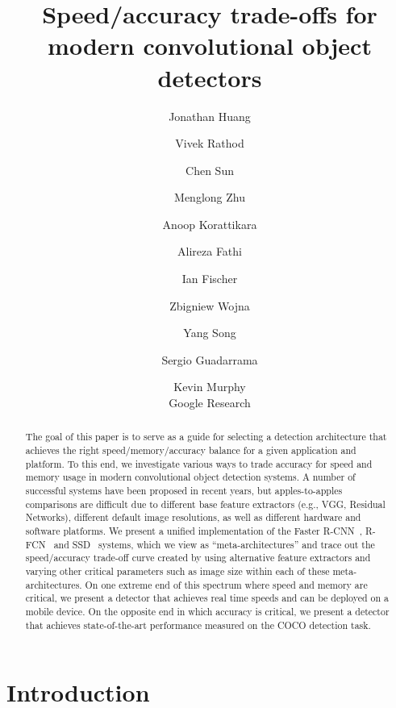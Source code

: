 \documentclass[10pt,twocolumn,letterpaper]{article}
\begin{document}
\title{Speed/accuracy trade-offs for modern convolutional object detectors}

\author{Jonathan Huang
  \and
  Vivek Rathod
  \and
  Chen Sun
  \and
  Menglong Zhu
  \and
  Anoop Korattikara
  \and
  Alireza Fathi
  \and
  Ian Fischer
  \and
  Zbigniew  Wojna
  \and
  Yang Song
  \and
  Sergio Guadarrama
\and
Kevin Murphy\\
Google Research
}

\maketitle



\begin{abstract}\vspace{-3mm}
  The goal of this paper is to serve as a guide for selecting a
   detection architecture that achieves the right
   speed/memory/accuracy balance for a given application and platform.
   To this end, we investigate various ways to trade accuracy for
   speed and memory usage in modern convolutional object detection
   systems.  A number of successful systems have been proposed in
   recent years, but apples-to-apples comparisons are difficult due to
   different base feature extractors (e.g., VGG, Residual Networks),
   different default image resolutions, as well as different hardware
   and software platforms.  We present a unified implementation of the
   Faster R-CNN~\cite{ren2015faster}, R-FCN~\cite{dai2016r} and
   SSD~\cite{liu2015ssd} systems, which we view as
   ``meta-architectures'' and trace out the speed/accuracy trade-off
   curve created by using alternative feature extractors and varying
   other critical parameters such as image size within each of these
   meta-architectures.  On one extreme end of this spectrum where
   speed and memory are critical, we present a detector that achieves
   real time speeds and can be deployed on a mobile device.  On the
   opposite end in which accuracy is critical, we present a detector
   that achieves state-of-the-art performance measured on the COCO
   detection task.
\end{abstract}

 \vspace{-5mm}
\section{Introduction}\vspace{-1mm}
\label{sec:intro}
\end{document}
